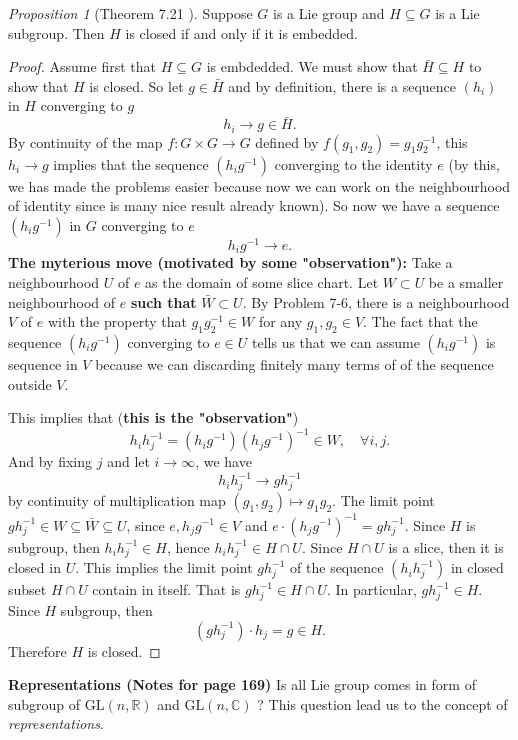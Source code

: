 \documentclass[a4paper]{article}
\theoremstyle{remark}
\newtheorem{prop}{Proposition}
\newcommand{\er}{\mathbb{R}} %
\begin{document}
\begin{prop}[Theorem 7.21 \cite{LeeSM}] Suppose $G$ is a Lie group and $H \subseteq G$ is a Lie subgroup. Then $H$ is closed if and only if it is embedded.
\end{prop}
\begin{proof}
Assume first that $H \subseteq G$ is embdedded. We must show that $\bar{H} \subseteq H$ to show that $H$ is closed. So let $g \in \bar{H}$ and by definition, there is a sequence $(h_i)$ in $H$ converging to $g$
$$
h_i \to g \in \bar{H}.
$$
By continuity of the map $f: G \times G \to G$ defined by $f(g_1,g_2) = g_1g_2^{-1}$, this $h_i \to g$ implies that the sequence $(h_i g^{-1})$ converging to the identity $e$ 
(by this, we has made the problems easier because now we can work on the neighbourhood of identity since is many nice result already known). So now we have a sequence $(h_ig^{-1})$ in $G$ converging to $e$
$$
h_ig^{-1} \to e.
$$
\textbf{The myterious move  (motivated by some "observation"):} Take a neighbourhood $U$ of $e$ as the domain of some slice chart. Let $W \subset U$ be a smaller neighbourhood of $e$ \textbf{such that} $\bar{W}\subset U$. By Problem 7-6, there is a neighbourhood $V$ of $e$ with the property that $g_1g_2^{-1} \in W$ for any $g_1,g_2 \in V$. The fact that the sequence $(h_ig^{-1})$ converging to $e \in U$ tells us that we can assume $(h_ig^{-1})$ is sequence in $V$ because we can discarding finitely many terms of of the sequence outside $V$.

This implies that (\textbf{this is the "observation"}) 
$$
h_ih_j^{-1} = (h_ig^{-1})(h_jg^{-1})^{-1} \in W, \quad \forall i,j.
$$
And by fixing $j$ and let $i \to \infty$, we have
$$
h_ih_j^{-1} \to gh_j^{-1}
$$
by continuity of multiplication map $(g_1,g_2) \mapsto g_1g_2$. The limit point $gh_j^{-1} \in W\subseteq \bar{W} \subseteq U$, since $e,h_jg^{-1} \in V$ and $e \cdot (h_jg^{-1})^{-1} = gh_j^{-1}$. Since $H$ is subgroup, then $h_ih_j^{-1} \in H$, hence $h_ih_j^{-1} \in H \cap U$. Since $H \cap U$ is a slice, then it is closed in $U$. This implies the limit point $gh_j^{-1}$ of the sequence $(h_ih_j^{-1})$ in closed subset $H \cap U$ contain in itself. That is $gh_j^{-1} \in H \cap U $. In particular, $gh_j^{-1} \in H$. Since $H$ subgroup, then
$$
(gh_j^{-1}) \cdot h_j = g \in H.
$$ 
Therefore $H$ is closed.
\end{proof}

\textbf{Representations (Notes for page 169)}
Is all Lie group comes in form of subgroup of $\text{GL}(n,\er)$ and $\text{GL}(n,\mathbb{C})$ ? This question lead us to the concept of \textit{representations}.
\end{document}
